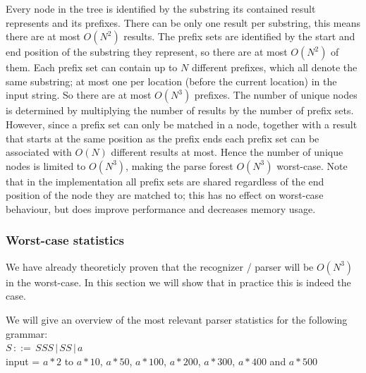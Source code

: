 \documentclass[a4paper,10pt]{article}
\begin{document}
Every node in the tree is identified by the substring its contained result represents and its prefixes. There can be only one result per substring, this means there are at most $O(N^2)$ results. The prefix sets are identified by the start and end position of the substring they represent, so there are at most $O(N^2)$ of them. Each prefix set can contain up to $N$ different prefixes, which all denote the same substring; at most one per location (before the current location) in the input string. So there are at most $O(N^3)$ prefixes. The number of unique nodes is determined by multiplying the number of results by the number of prefix sets. However, since a prefix set can only be matched in a node, together with a result that starts at the same position as the prefix ends each prefix set can be associated with $O(N)$ different results at most. Hence the number of unique nodes is limited to $O(N^3)$, making the parse forest $O(N^3)$ worst-case. Note that in the implementation all prefix sets are shared regardless of the end position of the node they are matched to; this has no effect on worst-case behaviour, but does improve performance and decreases memory usage.

\subsubsection{Worst-case statistics}
We have already theoreticly proven that the recognizer / parser will be $O(N^3)$ in the worst-case. In this section we will show that in practice this is indeed the case.

We will give an overview of the most relevant parser statistics for the following grammar:\\
$S\,::=\,SSS\,|\,SS\,|\,a$\\
input = $a * 2$ to $a * 10$, $a * 50$, $a * 100$, $a * 200$, $a * 300$, $a * 400$ and $a * 500$
\end{document}
